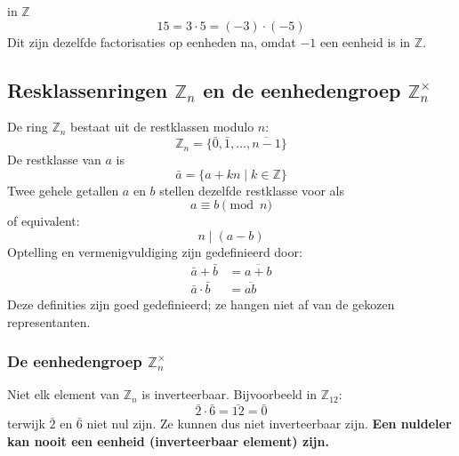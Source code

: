 \textbf{} in $\mathbb{Z}$
\begin{equation*}
    15 = 3 \cdot 5 = (-3) \cdot (-5)
\end{equation*}
Dit zijn dezelfde factorisaties op eenheden na, omdat $-1$ een eenheid is in $\mathbb{Z}$.

\subsection{Resklassenringen \texorpdfstring{$\mathbb{Z}_n$}{Zn} en de eenhedengroep \texorpdfstring{$\mathbb{Z}_n^{\times}$}{Zn*}}


De ring $\mathbb{Z}_n$ bestaat uit de restklassen modulo $n$:
\begin{equation*}
    \mathbb{Z}_n = \{\bar{0},\bar{1},\dots,\overline{n-1}\}
\end{equation*}
De restklasse van $a$ is
\begin{equation*}
    \bar{a} = \{a +kn \mid k \in \mathbb{Z}\}
\end{equation*}
Twee gehele getallen $a$ en $b$ stellen dezelfde restklasse voor als
\begin{equation*}
    a \equiv b \pmod{n}
\end{equation*}
of equivalent:
\begin{equation*}
    n \mid (a - b)
\end{equation*}
Optelling en vermenigvuldiging zijn gedefinieerd door:
\begin{equation*}
    \begin{aligned}
        \bar{a} + \bar{b}     &= \overline{a+b} \\
        \bar{a} \cdot \bar{b} &= \overline{ab}
    \end{aligned}
\end{equation*}
Deze definities zijn goed gedefinieerd; ze hangen niet af van de gekozen representanten.

\subsubsection{De eenhedengroep \texorpdfstring{$\mathbb{Z}_n^{\times}$}{Znx}}

Niet elk element van $\mathbb{Z}_n$ is inverteerbaar. Bijvoorbeeld in $\mathbb{Z}_{12}$:
\begin{equation*}
    \bar{2} \cdot \bar{6} = \bar{12} = \bar{0}
\end{equation*}
terwijk $\bar{2}$ en $\bar{6}$ niet nul zijn. Ze kunnen dus niet inverteerbaar zijn. \textbf{Een nuldeler kan nooit een eenheid (inverteerbaar element) zijn.}

